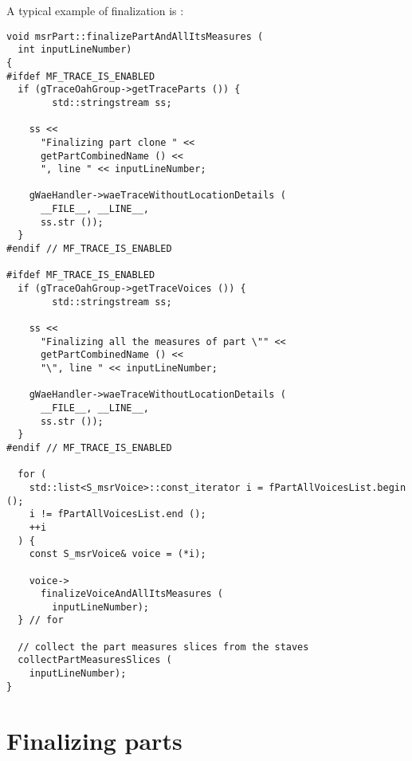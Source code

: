 A typical example of \cascading finalization is :
\begin{lstlisting}[language=CPlusPlus]
void msrPart::finalizePartAndAllItsMeasures (
  int inputLineNumber)
{
#ifdef MF_TRACE_IS_ENABLED
  if (gTraceOahGroup->getTraceParts ()) {
		std::stringstream ss;

    ss <<
      "Finalizing part clone " <<
      getPartCombinedName () <<
      ", line " << inputLineNumber;

    gWaeHandler->waeTraceWithoutLocationDetails (
      __FILE__, __LINE__,
      ss.str ());
  }
#endif // MF_TRACE_IS_ENABLED

#ifdef MF_TRACE_IS_ENABLED
  if (gTraceOahGroup->getTraceVoices ()) {
		std::stringstream ss;

    ss <<
      "Finalizing all the measures of part \"" <<
      getPartCombinedName () <<
      "\", line " << inputLineNumber;

    gWaeHandler->waeTraceWithoutLocationDetails (
      __FILE__, __LINE__,
      ss.str ());
  }
#endif // MF_TRACE_IS_ENABLED

  for (
    std::list<S_msrVoice>::const_iterator i = fPartAllVoicesList.begin ();
    i != fPartAllVoicesList.end ();
    ++i
  ) {
    const S_msrVoice& voice = (*i);

    voice->
      finalizeVoiceAndAllItsMeasures (
        inputLineNumber);
  } // for

  // collect the part measures slices from the staves
  collectPartMeasuresSlices (
    inputLineNumber);
}
\end{lstlisting}


\section{Finalizing parts}

